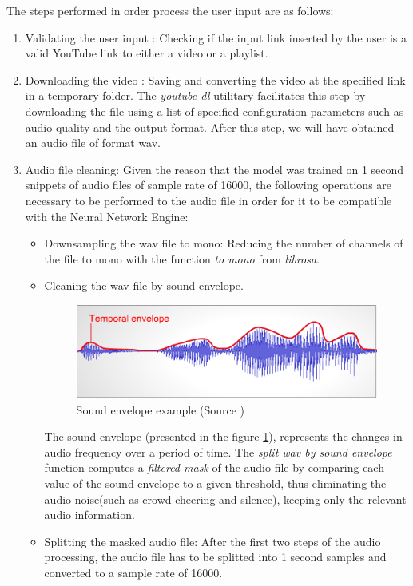 The steps performed in order process the user input are as follows:
\begin{enumerate}

	\item Validating the user input : Checking if the input link inserted by the user is a valid YouTube link to
	either a video or a playlist.
	\item Downloading the video : Saving and converting the video at the specified link in a temporary folder.
		The \textit{youtube-dl} utilitary facilitates this step by downloading the file using
	a list of specified configuration parameters such as audio quality and the output format. After this step,
	we will have obtained an audio file of format wav.
	\item Audio file cleaning: Given the reason that the model was trained on 1 second snippets of audio files of sample rate of 16000,
		the following operations are necessary to be performed to the audio file in order for it to be compatible with the Neural Network Engine:
		\begin{itemize}
			\item Downsampling the wav file to mono: Reducing the number of channels of the file to
			mono with the function \textit{to mono} from \textit{librosa}.
			\item Cleaning the wav file by sound envelope.
			\begin{figure}[H]
				\centering
				\includegraphics{images/soundenvelope.png}
				\caption{Sound envelope example (Source \cite{sev})}
			\label{se}
			\end{figure}

	The sound envelope (presented in the figure \ref{se}), represents the changes in audio frequency over a period
	of time. The \textit{split wav by sound envelope} function computes a \textit{filtered mask} of the audio file
	by comparing each value of the sound envelope to a given threshold, thus eliminating the audio noise(such as
	crowd cheering and silence), keeping only the relevant audio information.

			\item Splitting the masked audio file: After the first two steps of the audio processing,
	the audio file has to be splitted into 1 second samples and converted to a sample rate of 16000.
		\end{itemize}


\end{enumerate}
